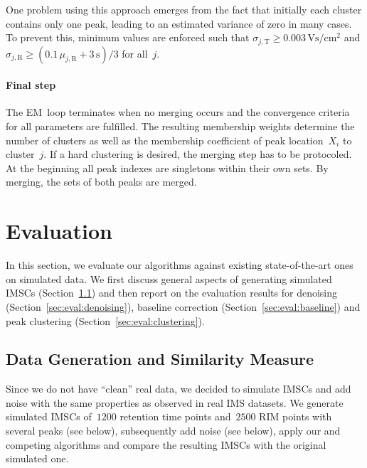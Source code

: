 \documentclass{article}
\begin{document}
One problem using this approach emerges from the fact that initially each cluster contains only one peak, leading to an estimated variance of zero in many cases.
To prevent this, minimum values are enforced such that  $\sigma_{j,\text{T}} \geq 0.003\,\text{Vs}/\text{cm}^2$ and $\sigma_{j,\text{R}} \geq (0.1\, \mu_{j,\text{R}} + 3\,\text{s}) / 3$ for all~$j$.

\paragraph*{Final step}
The EM~loop terminates when no merging occurs and the convergence criteria for all parameters are fulfilled.
The resulting membership weights determine the number of clusters as well as the membership coefficient of peak location~$X_i$ to cluster~$j$.
If a hard clustering is desired, the merging step has to be protocoled.
At the beginning all peak indexes are singletons within their own sets.
By merging, the sets of both peaks are merged.



\section{Evaluation}
\label{sec:eval}

In this section, we evaluate our algorithms against existing state-of-the-art ones on simulated data.
We first discuss general aspects of generating simulated IMSCs (Section~\ref{sec:eval:general}) and then report on the evaluation results for denoising (Section~\ref{sec:eval:denoising}), baseline correction (Section~\ref{sec:eval:baseline}) and peak clustering (Section~\ref{sec:eval:clustering}).

\subsection{Data Generation and Similarity Measure}
\label{sec:eval:general}

Since we do not have ``clean'' real data, we decided to simulate IMSCs and add noise with the same properties as observed in real IMS datasets.
We generate simulated IMSCs of~$1200$ retention time points and~$2500$ RIM points with several peaks (see below), subsequently add noise (see below), apply our and competing algorithms and compare the resulting IMSCs with the original simulated one.
\end{document}

